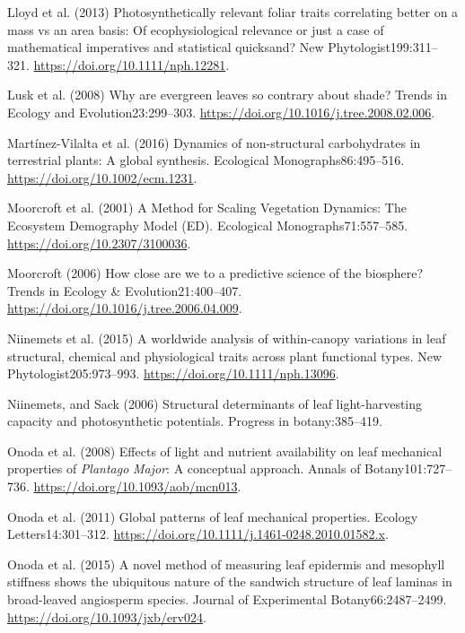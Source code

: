 \documentclass[
  12pt,
  letterpaper,
  DIV=11,
  numbers=noendperiod]{scrartcl}
\newlength{\cslhangindent}
\newenvironment{CSLReferences}[2] %
 {\begin{list}{}{%
  \setlength{\itemindent}{0pt}
  \setlength{\leftmargin}{0pt}
  \setlength{\parsep}{0pt}
  \ifodd #1
   \setlength{\leftmargin}{\cslhangindent}
   \setlength{\itemindent}{-1\cslhangindent}
  \fi
  \setlength{\itemsep}{#2\baselineskip}}}
 {\end{list}}
\begin{document}
\begin{CSLReferences}{1}{1}
Lloyd et al. (2013) Photosynthetically relevant foliar traits
correlating better on a mass vs an area basis: {Of} ecophysiological
relevance or just a case of mathematical imperatives and statistical
quicksand? New Phytologist199:311--321.
\url{https://doi.org/10.1111/nph.12281}.

Lusk et al. (2008) Why are evergreen leaves so contrary about shade?
Trends in Ecology and Evolution23:299--303.
\url{https://doi.org/10.1016/j.tree.2008.02.006}.

Martínez-Vilalta et al. (2016) Dynamics of non-structural carbohydrates
in terrestrial plants: A global synthesis. Ecological
Monographs86:495--516. \url{https://doi.org/10.1002/ecm.1231}.

Moorcroft et al. (2001) A {Method} for {Scaling Vegetation Dynamics}:
{The Ecosystem Demography Model} ({ED}). Ecological
Monographs71:557--585. \url{https://doi.org/10.2307/3100036}.

Moorcroft (2006) How close are we to a predictive science of the
biosphere? Trends in Ecology \& Evolution21:400--407.
\url{https://doi.org/10.1016/j.tree.2006.04.009}.

Niinemets et al. (2015) A worldwide analysis of within-canopy variations
in leaf structural, chemical and physiological traits across plant
functional types. New Phytologist205:973--993.
\url{https://doi.org/10.1111/nph.13096}.

Niinemets, and Sack (2006) Structural determinants of leaf
light-harvesting capacity and photosynthetic potentials. Progress in
botany:385--419.

Onoda et al. (2008) Effects of light and nutrient availability on leaf
mechanical properties of {\emph{Plantago}}{ \emph{Major}}: {A}
conceptual approach. Annals of Botany101:727--736.
\url{https://doi.org/10.1093/aob/mcn013}.

Onoda et al. (2011) Global patterns of leaf mechanical properties.
Ecology Letters14:301--312.
\url{https://doi.org/10.1111/j.1461-0248.2010.01582.x}.

Onoda et al. (2015) A novel method of measuring leaf epidermis and
mesophyll stiffness shows the ubiquitous nature of the sandwich
structure of leaf laminas in broad-leaved angiosperm species. Journal of
Experimental Botany66:2487--2499.
\url{https://doi.org/10.1093/jxb/erv024}.


\end{CSLReferences}
\end{document}
